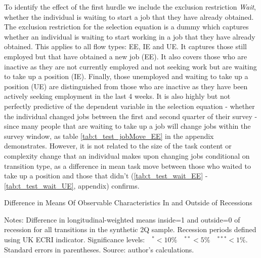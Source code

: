 \documentclass[12pt,authoryear]{elsarticle}
\begin{document}
To identify the effect of the first hurdle we include the exclusion restriction \textit{Wait}, whether the individual is waiting to start a job that they have already obtained. The exclusion restriction for the selection equation is a dummy which captures whether an individual is waiting to start working in a job that they have already obtained. This applies to all flow types: EE, IE and UE. It captures those still employed but that have obtained a new job (EE). It also covers those who are inactive as they are not currently employed and not seeking work but are waiting to take up a position (IE). Finally, those unemployed and waiting to take up a position (UE) are distinguished from those who are inactive as they have been actively seeking employment in the last 4 weeks. It is also highly but not perfectly predictive of the dependent variable in the selection equation - whether the individual changed jobs between the first and second quarter of their survey - since many people that are waiting to take up a job will change jobs within the survey window, as table \ref{tab:t_test_jobMove_EE} in the appendix demonstrates. However, it is not related to the size of the task content or complexity change that an individual makes upon changing jobs conditional on transition type, as a difference in mean task move between those who waited to take up a position and those that didn't (\ref{tab:t_test_wait_EE} - \ref{tab:t_test_wait_UE}, appendix) confirms.


	\newpage
\thispagestyle{empty}
\begin{table}[H]
	\centering
	\caption{Difference in Means Of Observable Characteristics In and Outside of Recessions}\label{tab:diffMeans}
	\begin{adjustbox}{max width=16cm, max height=10cm}
		\begin{threeparttable}
			
			\begin{tablenotes}
				\item \footnotesize{Notes: Difference in longitudinal-weighted means inside=1 and outside=0 of recession for all transitions in the synthetic 2Q sample. Recession periods defined using UK ECRI indicator. Significance levels:$ \quad ^{*}<10\% \quad ^{**}<5\% \quad ^{***}<1\%$. Standard errors in parentheses. Source: author's calculations.}  
			\end{tablenotes}
		\end{threeparttable}
	\end{adjustbox}
\end{table}
\newpage
\end{document}
